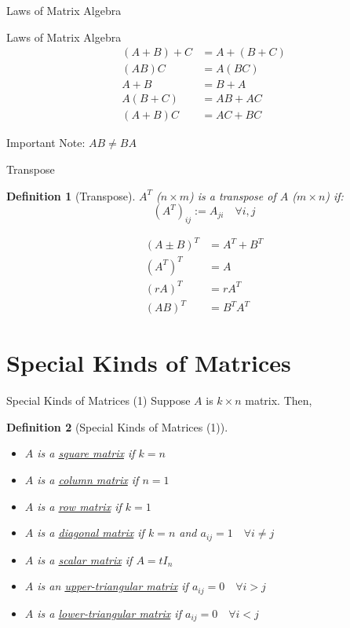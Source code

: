 \documentclass[final]{beamer}
\newtheorem{defn}{Definition}
\begin{document}
\begin{frame}[t]{Laws of Matrix Algebra}
	\begin{block}
		{Laws of Matrix Algebra}
		\begin{align*}
				(A+B)+C &= A+(B+C) \tag{Associative Law for Addition}\\
				(AB)C&=A(BC)\tag{Associative Law for Multiplication}\\
				A+B &= B+A \tag{Commutative Law for Addition}\\
				A(B+C)&=AB+AC \tag{Distributive Law}\\
				(A+B)C&=AC+BC \tag{Distributive Law}
		\end{align*}
	\end{block}
	Important Note: $AB\neq BA$
\end{frame}

\begin{frame}[t]{Transpose}
	\begin{defn}
		[Transpose]
		$A^T$ ($n\times m$) is a transpose of $A$ ($m\times n$) if: \[
			(A^T)_{ij} := A_{ji}\quad \forall i,j
		\]
	\end{defn}
	\begin{align*}
		(A\pm B)^T &= A^T + B^T\\
		(A^T)^T &= A\\
		(rA)^T &= r A^T\\
		(AB)^T &= B^T A^T \tag{Theorem 8.1}
	\end{align*}
\end{frame}

\section{Special Kinds of Matrices} %
\label{sec:special_kinds_of_matrices}
\begin{frame}[t]{Special Kinds of Matrices (1)}
	Suppose $A$ is $k\times n$ matrix. Then,
	\begin{defn}
		[Special Kinds of Matrices (1)]
		\begin{itemize}
			\item $A$ is a \uline{square matrix} if $k=n$
			\item $A$ is a \uline{column matrix} if $n=1$
			\item $A$ is a \uline{row matrix} if $k=1$
			\item $A$ is a \uline{diagonal matrix} if $k=n$ and $a_{ij}=1\quad \forall i\neq j$
			\item $A$ is a \uline{scalar matrix} if $A=tI_n$
			\item $A$ is an \uline{upper-triangular matrix} if $a_{ij}=0\quad\forall i>j$
			\item $A$ is a \uline{lower-triangular matrix} if $a_{ij}=0\quad\forall i<j$
		\end{itemize}
	\end{defn}
\end{frame}
\end{document}
